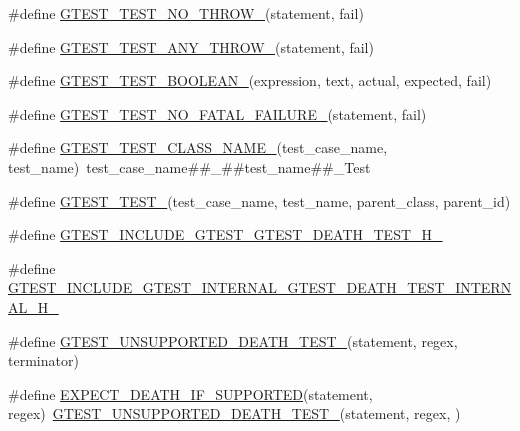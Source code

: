 \begin{DoxyCompactItemize}
\#define \hyperlink{fused-src_2gtest_2gtest_8h_a9a109d026b5a904646437d7570e13581}{G\-T\-E\-S\-T\-\_\-\-T\-E\-S\-T\-\_\-\-N\-O\-\_\-\-T\-H\-R\-O\-W\-\_\-}(statement, fail)
\item 
\#define \hyperlink{fused-src_2gtest_2gtest_8h_af48bbd26d54d4afc5e4cef39b1c76ba3}{G\-T\-E\-S\-T\-\_\-\-T\-E\-S\-T\-\_\-\-A\-N\-Y\-\_\-\-T\-H\-R\-O\-W\-\_\-}(statement, fail)
\item 
\#define \hyperlink{fused-src_2gtest_2gtest_8h_ae8912365e1d00a7a2bd248268c64aa1a}{G\-T\-E\-S\-T\-\_\-\-T\-E\-S\-T\-\_\-\-B\-O\-O\-L\-E\-A\-N\-\_\-}(expression, text, actual, expected, fail)
\item 
\#define \hyperlink{fused-src_2gtest_2gtest_8h_a1b37a3c446836d33040f3266a6236081}{G\-T\-E\-S\-T\-\_\-\-T\-E\-S\-T\-\_\-\-N\-O\-\_\-\-F\-A\-T\-A\-L\-\_\-\-F\-A\-I\-L\-U\-R\-E\-\_\-}(statement, fail)
\item 
\#define \hyperlink{fused-src_2gtest_2gtest_8h_a87a1ee3a3b9b798195236d053f2e5dcc}{G\-T\-E\-S\-T\-\_\-\-T\-E\-S\-T\-\_\-\-C\-L\-A\-S\-S\-\_\-\-N\-A\-M\-E\-\_\-}(test\-\_\-case\-\_\-name, test\-\_\-name)~test\-\_\-case\-\_\-name\#\#\-\_\-\#\#test\-\_\-name\#\#\-\_\-\-Test
\item 
\#define \hyperlink{fused-src_2gtest_2gtest_8h_ae2d26f0f92fbaf62bf4c1eca45bb2f1f}{G\-T\-E\-S\-T\-\_\-\-T\-E\-S\-T\-\_\-}(test\-\_\-case\-\_\-name, test\-\_\-name, parent\-\_\-class, parent\-\_\-id)
\item 
\#define \hyperlink{fused-src_2gtest_2gtest_8h_a9be22723f67d5ad4d6d26214a84a19f9}{G\-T\-E\-S\-T\-\_\-\-I\-N\-C\-L\-U\-D\-E\-\_\-\-G\-T\-E\-S\-T\-\_\-\-G\-T\-E\-S\-T\-\_\-\-D\-E\-A\-T\-H\-\_\-\-T\-E\-S\-T\-\_\-\-H\-\_\-}
\item 
\#define \hyperlink{fused-src_2gtest_2gtest_8h_a83e03f206a1c53a656f7eac87c122d16}{G\-T\-E\-S\-T\-\_\-\-I\-N\-C\-L\-U\-D\-E\-\_\-\-G\-T\-E\-S\-T\-\_\-\-I\-N\-T\-E\-R\-N\-A\-L\-\_\-\-G\-T\-E\-S\-T\-\_\-\-D\-E\-A\-T\-H\-\_\-\-T\-E\-S\-T\-\_\-\-I\-N\-T\-E\-R\-N\-A\-L\-\_\-\-H\-\_\-}
\item 
\#define \hyperlink{fused-src_2gtest_2gtest_8h_a29a145cda8bd2d0c6a78b0ac1d670d18}{G\-T\-E\-S\-T\-\_\-\-U\-N\-S\-U\-P\-P\-O\-R\-T\-E\-D\-\_\-\-D\-E\-A\-T\-H\-\_\-\-T\-E\-S\-T\-\_\-}(statement, regex, terminator)
\item 
\#define \hyperlink{fused-src_2gtest_2gtest_8h_a8564de0e012dd0898949c513d1571f8b}{E\-X\-P\-E\-C\-T\-\_\-\-D\-E\-A\-T\-H\-\_\-\-I\-F\-\_\-\-S\-U\-P\-P\-O\-R\-T\-E\-D}(statement, regex)~\hyperlink{gtest-death-test-internal_8h_a29a145cda8bd2d0c6a78b0ac1d670d18}{G\-T\-E\-S\-T\-\_\-\-U\-N\-S\-U\-P\-P\-O\-R\-T\-E\-D\-\_\-\-D\-E\-A\-T\-H\-\_\-\-T\-E\-S\-T\-\_\-}(statement, regex, )

\end{DoxyCompactItemize}
